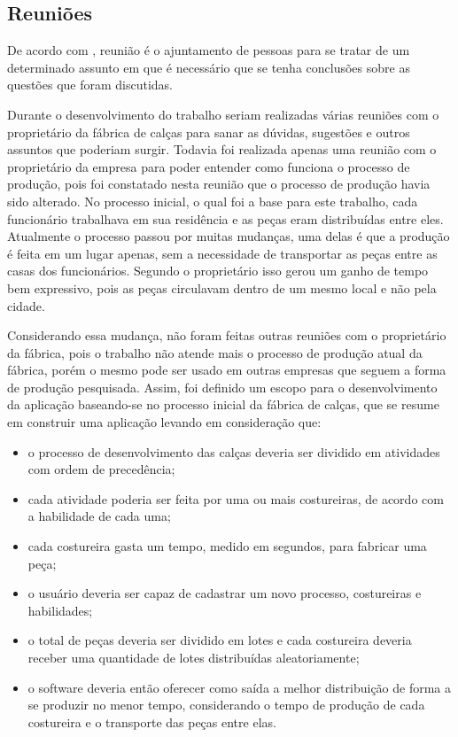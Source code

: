 \subsection{Reuniões}
\par De acordo com , reunião é o ajuntamento de
pessoas para se tratar de um determinado assunto em que é necessário que se
tenha conclusões sobre as questões que foram discutidas.

\par Durante o desenvolvimento do trabalho seriam realizadas várias reuniões
com o proprietário da fábrica de calças para sanar as dúvidas, sugestões e
outros assuntos que poderiam surgir. Todavia foi realizada apenas uma reunião com o proprietário
da empresa para poder entender como funciona o processo de produção, pois foi constatado nesta reunião que o
processo de produção havia sido alterado. No processo inicial, o qual foi a base
para este trabalho, cada funcionário trabalhava em sua residência e as peças eram distribuídas entre eles. Atualmente o processo
passou por muitas mudanças, uma delas é que a produção é feita em um lugar
apenas, sem a necessidade de transportar as peças entre as casas dos
funcionários. Segundo o proprietário isso gerou um ganho de tempo bem
expressivo, pois as peças circulavam dentro de um mesmo local e não pela cidade. 

\par Considerando essa mudança, não foram feitas outras reuniões com o
proprietário da fábrica, pois o trabalho não atende mais o processo de produção
atual da fábrica, porém o mesmo pode ser usado em outras empresas que seguem a
forma de produção pesquisada. Assim, foi definido um escopo para o desenvolvimento da aplicação baseando-se no 
processo inicial da fábrica de calças, que se resume em construir uma aplicação levando em consideração que:

\begin{itemize}
	
	\item o processo de desenvolvimento das calças deveria ser dividido em
	atividades com ordem de precedência;
	
	\item cada atividade poderia ser feita por uma ou mais costureiras, de acordo
	com a habilidade de cada uma;
	
	\item cada costureira gasta um tempo, medido em segundos, para fabricar uma
	peça;
	
	\item o usuário deveria ser capaz de cadastrar um novo processo, costureiras e
	habilidades;
	
	\item o total de peças deveria ser dividido em lotes e cada costureira deveria
	receber uma quantidade de lotes distribuídas aleatoriamente;
	
	\item o software deveria então oferecer como saída a melhor distribuição de
	forma a se produzir no menor tempo, considerando o tempo de produção de cada costureira e o transporte das peças entre elas.
	
\end{itemize}

